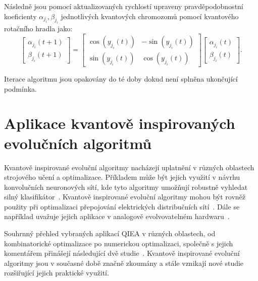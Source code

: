 Následně jsou pomocí aktualizovaných rychlostí upraveny pravděpodobnostní koeficienty $\alpha_{j_i}, \beta_{j_i}$ jednotlivých kvantových chromozomů pomocí kvantového rotačního hradla jako: 
\begin{equation*}
    \begin{bmatrix}
        \alpha_{j_i}\left(t+1\right) \\
        \beta_{j_i}\left(t+1\right)
    \end{bmatrix}
    =
    \begin{bmatrix}
        \cos{\left( y_{j_i}\left(t\right) \right)} & - \sin{\left( y_{j_i}\left(t\right) \right)} \\
        \sin{\left( y_{j_i}\left(t\right) \right)} &   \cos{\left( y_{j_i}\left(t\right) \right)}
    \end{bmatrix}
    \begin{bmatrix}
        \alpha_{j_i}\left(t\right) \\
        \beta_{j_i}\left(t\right) 
    \end{bmatrix}.
\end{equation*}

Iterace algoritmu jsou opakovány do té doby dokud není splněna ukončující podmínka. 

\section{Aplikace kvantově inspirovaných evolučních algoritmů}
Kvantově inspirované evoluční algoritmy nacházejí uplatnění v různých oblastech strojového učení a optimalizace. 
Příkladem může být jejich využití v návrhu konvolučních neuronových sítí, kde tyto algoritmy umožňují robustně vyhledat silný klasifikátor~\cite{QIEA-CNN}. 
Kvantově inspirované evoluční algoritmy mohou být rovněž použity při optimalizaci přepojování elektrických distribučních sítí~\cite{QIEA-net}. 
Dále se například uvažuje jejich aplikace v analogově evolvovatelném hardwaru~\cite{QIEA-EHW}. 

Souhrnný přehled vybraných aplikací QIEA v různých oblastech, od kombinatorické optimalizace po numerickou optimalizaci, společně s jejich komentářem přinášejí následující dvě studie~\cite{QIEA-survey1, QIEA-survey2}. 
Kvantově inspirované evoluční algoritmy jsou v současné době značně zkoumány a stále vznikají nové studie rozšiřující jejich praktické využití. 

